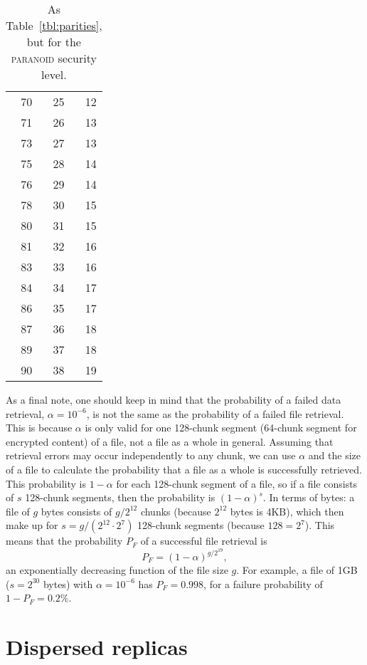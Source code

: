 \documentclass[a4paper,11pt]{article}
\begin{document}
\begin{table}[!ht]
\begin{minipage}{.49\linewidth}
\begin{tabular}{|r|r|r|}
70 & 25 & 12\\
71 & 26 & 13\\
73 & 27 & 13\\
75 & 28 & 14\\
76 & 29 & 14\\
78 & 30 & 15\\
80 & 31 & 15\\
81 & 32 & 16\\
83 & 33 & 16\\
84 & 34 & 17\\
86 & 35 & 17\\
87 & 36 & 18\\
89 & 37 & 18\\
90 & 38 & 19\\
\hline
\end{tabular}
\end{minipage}
\caption{As Table~\ref{tbl:parities}, but for the \textsc{paranoid} security level.}
\label{tbl:paranoid}
\end{table}

As a final note, one should keep in mind that the probability of a failed data retrieval, $\alpha = 10^{-6}$, is not the same as the probability of a failed file retrieval. This is because $\alpha$ is only valid for one 128-chunk segment (64-chunk segment for encrypted content) of a file, not a file as a whole in general. Assuming that retrieval errors may occur independently to any chunk, we can use $\alpha$ and the size of a file to calculate the probability that a file as a whole is successfully retrieved. This probability is $1 - \alpha$ for each 128-chunk segment of a file, so if a file consists of $s$ 128-chunk segments, then the probability is $(1-\alpha)^s$. In terms of bytes: a file of $g$ bytes consists of $g / 2^{12}$ chunks (because $2^{12}$ bytes is 4KB), which then make up for $s = g / (2^{12} \cdot 2^{7})$ 128-chunk segments (because $128 = 2^7$). This means that the probability $P_F$ of a successful file retrieval is
\begin{equation}
  P_F = (1 - \alpha)^{g/2^{19}} ,
  \label{eq-P-file}
\end{equation}
an exponentially decreasing function of the file size $g$. For example, a file of 1GB ($s = 2^{30}$ bytes) with $\alpha = 10^{-6}$ has $P_F = 0.998$, for a failure probability of $1 - P_F = 0.2\%$.




\section{Dispersed replicas}
\label{sec:dispersed-replicas}
\end{document}
